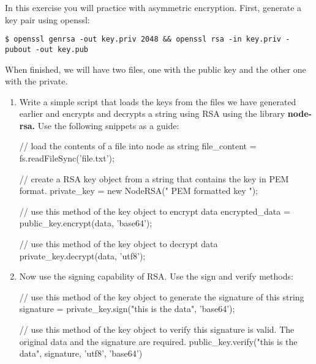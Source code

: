
\begin{Exercise}[label={basic-js-crypto-rsa}]
In this exercise you will practice with asymmetric encryption.
First, generate a key pair using openssl:

\begin{lstlisting}[style=terms]
$ openssl genrsa -out key.priv 2048 && openssl rsa -in key.priv -pubout -out key.pub
\end{lstlisting}

When finished, we will have two files, 
one with the public key and the other one with the private.

\begin{enumerate}[1.]

\item Write a simple script that loads the keys from the files we have generated earlier and encrypts and decrypts a string using RSA using the library \textbf{node-rsa.}
Use the following snippets as a guide:
\begin{js}
// load the contents of a file into node as string
file_content = fs.readFileSync('file.txt');

// create a RSA key object from a string that contains the key in PEM format.
private_key = new NodeRSA(" PEM formatted key ");

// use this method of the key object to encrypt data
encrypted_data = public_key.encrypt(data, 'base64');

// use this method of the key object to decrypt data
private_key.decrypt(data, 'utf8');
\end{js}
\item Now use the signing capability of RSA. Use the sign and verify methods:
\begin{js}
// use this method of the key object to generate the signature of this string
signature = private_key.sign("this is the data", 'base64');

// use this method of the key object to verify this signature is valid. The original data and the signature are required.
public_key.verify("this is the data", signature, 'utf8', 'base64')
\end{js}
	
\end{enumerate}
\end{Exercise}

